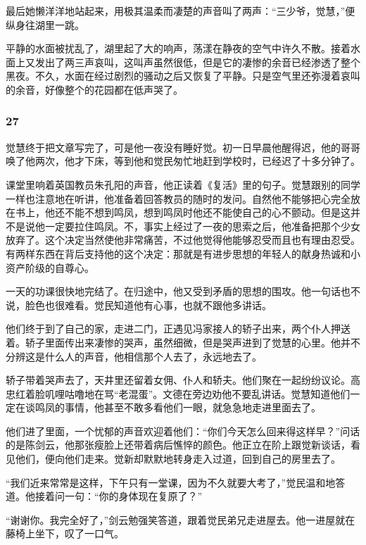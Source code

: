 \par 最后她懒洋洋地站起来，用极其温柔而凄楚的声音叫了两声：“三少爷，觉慧，”便纵身往湖里一跳。
\par 平静的水面被扰乱了，湖里起了大的响声，荡漾在静夜的空气中许久不散。接着水面上又发出了两三声哀叫，这叫声虽然很低，但是它的凄惨的余音已经渗透了整个黑夜。不久，水面在经过剧烈的骚动之后又恢复了平静。只是空气里还弥漫着哀叫的余音，好像整个的花园都在低声哭了。


\subsubsection*{27}


\par 觉慧终于把文章写完了，可是他一夜没有睡好觉。初一日早晨他醒得迟，他的哥哥唤了他两次，他才下床，等到他和觉民匆忙地赶到学校时，已经迟了十多分钟了。
\par 课堂里响着英国教员朱孔阳的声音，他正读着《复活》里的句子。觉慧跟别的同学一样也注意地在听讲，他准备着回答教员的随时的发问。自然他不能够把心完全放在书上，他还不能不想到鸣凤，想到鸣凤时他还不能使自己的心不颤动。但是这并不是说他一定要拉住鸣凤。不，事实上经过了一夜的思索之后，他准备把那个少女放弃了。这个决定当然使他非常痛苦，不过他觉得他能够忍受而且也有理由忍受。有两样东西在背后支持他的这个决定：那就是有进步思想的年轻人的献身热诚和小资产阶级的自尊心。
\par 一天的功课很快地完结了。在归途中，他又受到矛盾的思想的围攻。他一句话也不说，脸色也很难看。觉民知道他有心事，也就不跟他多讲话。
\par 他们终于到了自己的家，走进二门，正遇见冯家接人的轿子出来，两个仆人押送着。轿子里面传出来凄惨的哭声，虽然细微，但是哭声进到了觉慧的心里。他并不分辨这是什么人的声音，他相信那个人去了，永远地去了。
\par 轿子带着哭声去了，天井里还留着女佣、仆人和轿夫。他们聚在一起纷纷议论。高忠红着脸叽哩咕噜地在骂“老混蛋”。文德在旁边劝他不要乱讲话。觉慧知道他们一定在谈鸣凤的事情，他甚至不敢多看他们一眼，就急急地走进里面去了。
\par 他们进了里面，一个忧郁的声音欢迎着他们：“你们今天怎么回来得这样早？”问话的是陈剑云，他那张瘦脸上还带着病后憔悴的颜色。他正立在阶上跟觉新谈话，看见他们，便向他们走来。觉新却默默地转身走入过道，回到自己的房里去了。
\par “我们近来常常是这样，下午只有一堂课，因为不久就要大考了，”觉民温和地答道。他接着问一句：“你的身体现在复原了？”
\par “谢谢你。我完全好了，”剑云勉强笑答道，跟着觉民弟兄走进屋去。他一进屋就在藤椅上坐下，叹了一口气。
